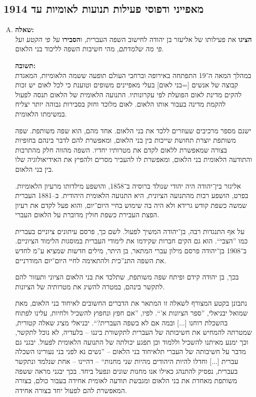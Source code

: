 \documentclass[a4paper]{article}
\newcommand\hl[1]   {#1}
\begin{document}
	\subsection{מאפייני ודפוסי פעילות תנועות לאומיות עד 1914}
		\begin{enumerate}[A.]
			\item \textbf{שאלה: }\\
			\textbf{הציגו} את פעילותו של אליעזר בן יהודה לחישוב השפה העברית, ו\textbf{הסבירו} \textit{על פי הקטע ועל פי מה שלמדתם}, מהי חשיבות השפה לליכוד בני הלאום. 
			
			\textbf{תשובה: }\\
			במהלך המאה ה־19 התפתחה באירופה וברחבי העולם תופעה ששמה \hl{הלאומיות}, המאגדת קבוצה של אנשים [=\hl{בני לאום}] בעלי מאפיינים משופים וטוענת כי לכל לאום יש זכות להקים \hl{מדינת לאום} הפועלת לפי עקרונותיו. \hl{התנועה הלאומית} של הלאום תנסה לפעול להקמת מדינה בעבור אותו הלאום. לאום מלוכד וחזק בסבירות גבוהה יותר יצליח במשימתו הלאומית. 
			
			ישנם מספר מרכיבים שעוזרים ללכד את בני הלאום. אחד מהם, הוא \hl{שפה משותפת}. שפה משותפת יוצרת תחושת שייכות בין בני הלאום, ומאפשרת להם לדבר בינהם בחופיות בצורה שמאפשרת ללאום לקדם את מטרותיו יחדיו. השפה מהווה חלק מהתרבות והתודעה הלאומית בני הלאום, ומאפשרת לו להעביר מסרים ולהפיץ את האידיאולוגיה שלו בין בני הלאום. 
			
			\hl{אליגזר בין־יהודה} היה יהודי שנולד ברוסיה ב־1858, והושפע מילדותו מרעיון הלאומיות. בפרט, הושפע רבות מ\hl{התנועה הציונית}, היא התנועה הלאומית היהודית. ב–1881 העברית שמשה כשפת קודש גרידא ולא היה בה שימוש בחיי היום־יום, והוא פעל לקדם את רעיון הפצת העבירת כשפת חולין מדוברת על הלאום העברי. 
			
			על אף התנגדות רבה, בן־יהודה המשיך לפעול. לשם כך, פרסם עיתונים ציוניים בעברית כמו ''הצבי``. הוא גם הקים חברות שקידמו את לימודי העברית במוסגות הלימוד הציוניים. ב־1908 בן־יהודה פרסם מילון עברי המתאר, בן היתר, מילים חדשות שמציא ע''מ לחדש את השפה התנ''כית ולהתאימה לחיי היום־יום המודרניים. 
			
			בכך, בן יהודה קידם ופיתח שפה משותפת, שתלכד את בני הלאום הציוני ותעזור להם לתקשר בינהם, במטרה להשיג את מטרותיה של הציונות. 
			
			נתבונן בקטע המצורף לשאלה זו המתאר את הדברים החשובים לאיחוד בני הלאום, מאת שמואל יבניאלי, ''ספר הציונות א'``. לפיו, ''אם חפץ ונחפוץ להשכיל ולחיות, עלינו לפתוח בהשכלת רוחנו [...] ובמה אם לא בשפה העברית?``. יבניאלי מציג שאלה קטורית, שמטרתה להמחיש את חשיבותה של העברית לתקשורת ביננו – בלעדיה, לא נוכל לתקשר, וכך ימנע מאיתנו להשכיל וללמוד וכן תפגע יכולתה של התנועה הלאומית לפעול. יבגני גם מדבר על חשיבותה של העברי תלאיחוד בני הלאום – ''נשים נא לפני בני נעורינו השכלה עברית [...] וחדלו להיות היהודים מהיות שני מחנות`` – דהיינו – אחת שנלמד ונתקשר בעברית, נפסיק להתנהג כאילו אנו מחנות שונים ונפעל ביחד. בכך יבגני מראה ששפה משותפת מאחדת את בני הלאום ומגבשת תודעה לאומית אחידה בעבור כולם, בצורה המאפשרת להם לפעול יחד בצורה אחידה. 
			

\end{enumerate}
\end{document}
